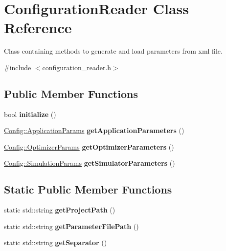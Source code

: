\hypertarget{class_configuration_reader}{}\section{Configuration\+Reader Class Reference}
\label{class_configuration_reader}


Class containing methods to generate and load parameters from xml file.  




{\ttfamily \#include $<$configuration\+\_\+reader.\+h$>$}

\subsection*{Public Member Functions}
\begin{DoxyCompactItemize}
\item 
\hypertarget{class_configuration_reader_a48396fe5ae72fe84728917c4d3c1d873}{}\label{class_configuration_reader_a48396fe5ae72fe84728917c4d3c1d873} 
bool {\bfseries initialize} ()
\item 
\hypertarget{class_configuration_reader_a8a9b59775e830c242e3a11ac7b1e60c4}{}\label{class_configuration_reader_a8a9b59775e830c242e3a11ac7b1e60c4} 
\hyperlink{struct_config_1_1_application_params}{Config\+::\+Application\+Params} {\bfseries get\+Application\+Parameters} ()
\item 
\hypertarget{class_configuration_reader_a26229de2dab15c900a09c8b3a2587a90}{}\label{class_configuration_reader_a26229de2dab15c900a09c8b3a2587a90} 
\hyperlink{struct_config_1_1_optimizer_params}{Config\+::\+Optimizer\+Params} {\bfseries get\+Optimizer\+Parameters} ()
\item 
\hypertarget{class_configuration_reader_a9a8d35884446e5d4c5beb769445f3b49}{}\label{class_configuration_reader_a9a8d35884446e5d4c5beb769445f3b49} 
\hyperlink{struct_config_1_1_simulation_params}{Config\+::\+Simulation\+Params} {\bfseries get\+Simulator\+Parameters} ()
\end{DoxyCompactItemize}
\subsection*{Static Public Member Functions}
\begin{DoxyCompactItemize}
\item 
\hypertarget{class_configuration_reader_a48d64d4b30e6b952848f95295cc6aae8}{}\label{class_configuration_reader_a48d64d4b30e6b952848f95295cc6aae8} 
static std\+::string {\bfseries get\+Project\+Path} ()
\item 
\hypertarget{class_configuration_reader_a8dd351a562599f9017911c9564b06716}{}\label{class_configuration_reader_a8dd351a562599f9017911c9564b06716} 
static std\+::string {\bfseries get\+Parameter\+File\+Path} ()
\item 
\hypertarget{class_configuration_reader_a2744da82a66457674996be080d2f37d8}{}\label{class_configuration_reader_a2744da82a66457674996be080d2f37d8} 
static std\+::string {\bfseries get\+Separator} ()
\end{DoxyCompactItemize}


